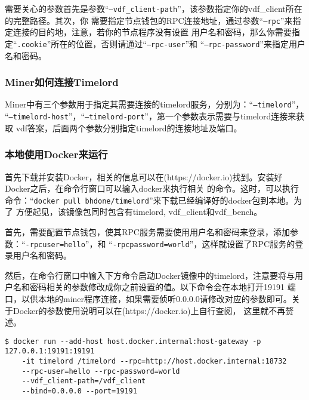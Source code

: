 \normalsize
\begin{flushleft}
    需要关心的参数首先是参数``\texttt{--vdf_client-path}''，该参数指定你的vdf\_client所在的完整路径。其次，你
    需要指定节点钱包的RPC连接地址，通过参数``\texttt{--rpc}''来指定连接的目的地，注意，若你的节点程序没有设置
    用户名和密码，那么你需要指定``\texttt{.cookie}''所在的位置，否则请通过``\texttt{--rpc-user}''和
    ``\texttt{--rpc-password}''来指定用户名和密码。
\end{flushleft}
\subsubsection{Miner如何连接Timelord}
\begin{flushleft}
    Miner中有三个参数用于指定其需要连接的timelord服务，分别为：``\texttt{--timelord}''，
    ``\texttt{--timelord-host}''，``\texttt{--timelord-port}''，第一个参数表示需要与timelord连接来获取
    vdf答案，后面两个参数分别指定timelord的连接地址及端口。
\end{flushleft}
\subsubsection{本地使用Docker来运行}
\begin{flushleft}
    首先下载并安装Docker，相关的信息可以在(https://docker.io)找到。安装好Docker之后，在命令行窗口可以输入docker来执行相关
    的命令。这时，可以执行命令：``\texttt{docker pull bhdone/timelord}''来下载已经编译好的docker包到本地。为了
    方便起见，该镜像包同时包含有timelord, vdf\_client和vdf\_bench。
\end{flushleft}
\begin{flushleft}
    首先，需要配置节点钱包，使其RPC服务需要使用用户名和密码来登录，添加参数：``\texttt{-rpcuser=hello}''，和
    ``\texttt{-rpcpassword=world}''，这样就设置了RPC服务的登录用户名和密码。
\end{flushleft}
\begin{flushleft}
    然后，在命令行窗口中输入下方命令启动Docker镜像中的timelord，注意要将与用户名和密码相关的参数修改成你之前设置的值。以下命令会在本地打开19191
    端口，以供本地的miner程序连接，如果需要侦听0.0.0.0请修改对应的参数即可。关于Docker的参数使用说明可以在(https://docker.io)上自行查阅，
    这里就不再赘述。
\end{flushleft}
\scriptsize
\begin{verbatim}
$ docker run --add-host host.docker.internal:host-gateway -p 127.0.0.1:19191:19191
    -it timelord /timelord --rpc=http://host.docker.internal:18732
    --rpc-user=hello --rpc-password=world
    --vdf_client-path=/vdf_client
    --bind=0.0.0.0 --port=19191
\end{verbatim}
\normalsize
